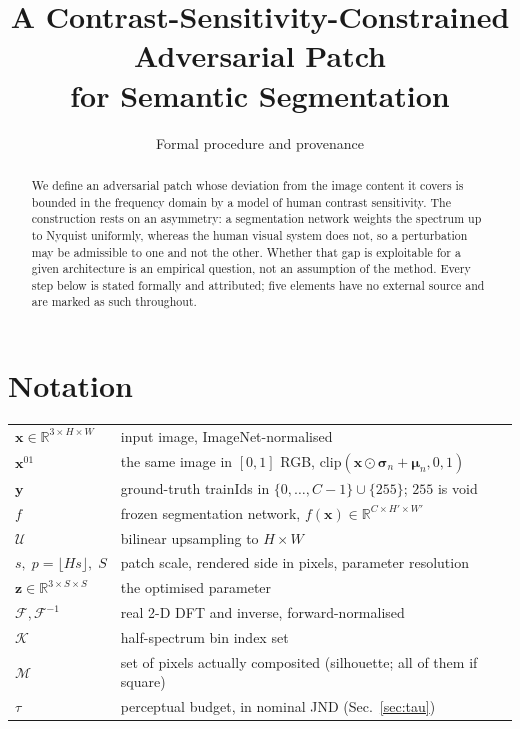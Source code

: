 \documentclass[11pt,a4paper]{article}
\title{A Contrast-Sensitivity-Constrained Adversarial Patch\\
       for Semantic Segmentation}
\author{Formal procedure and provenance}
\date{}
\begin{document}
\maketitle

\begin{abstract}
\noindent
We define an adversarial patch whose deviation from the image content it
covers is bounded in the frequency domain by a model of human contrast
sensitivity. The construction rests on an asymmetry: a segmentation
network weights the spectrum up to Nyquist uniformly, whereas the human
visual system does not, so a perturbation may be admissible to one and
not the other. Whether that gap is exploitable for a given architecture
is an empirical question, not an assumption of the method. Every step
below is stated formally and attributed; five elements have no external
source and are marked as such throughout.
\end{abstract}

\section{Notation}

\begin{tabular}{@{}lL{9.4cm}@{}}
\toprule
$\mathbf{x}\in\mathbb{R}^{3\times H\times W}$ & input image, ImageNet-normalised \\
$\mathbf{x}^{01}$ & the same image in $[0,1]$ RGB, $\mathrm{clip}(\mathbf{x}\odot\boldsymbol{\sigma}_n+\boldsymbol{\mu}_n,0,1)$ \\
$\mathbf{y}$ & ground-truth trainIds in $\{0,\dots,C-1\}\cup\{255\}$; $255$ is void \\
$f$ & frozen segmentation network, $f(\mathbf{x})\in\mathbb{R}^{C\times H'\times W'}$ \\
$\mathcal{U}$ & bilinear upsampling to $H\times W$ \\
$s,\;p=\lfloor Hs\rfloor,\;S$ & patch scale, rendered side in pixels, parameter resolution \\
$\mathbf{z}\in\mathbb{R}^{3\times S\times S}$ & the optimised parameter \\
$\mathcal{F},\mathcal{F}^{-1}$ & real 2-D DFT and inverse, forward-normalised \\
$\mathcal{K}$ & half-spectrum bin index set \\
$\mathcal{M}$ & set of pixels actually composited (silhouette; all of them if square) \\
$\tau$ & perceptual budget, in nominal JND (Sec.~\ref{sec:tau}) \\
\bottomrule
\end{tabular}
\end{document}
